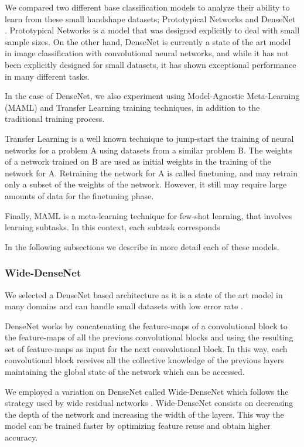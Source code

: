 We compared two different base classification models to analyze their ability to learn from these small handshape datasets; Prototypical Networks \cite{protonet} and DenseNet \cite{densenet}. Prototypical Networks is a model that was designed explicitly to deal with small sample sizes. On the other hand, DenseNet is currently a state of the art model in image classification with convolutional neural networks, and while it has not been explicitly designed for small datasets, it has shown exceptional performance in many different tasks. 

In the case of DenseNet, we also experiment using Model-Agnostic Meta-Learning (MAML) \cite{DBLP:journals/corr/FinnAL17} and Transfer Learning \cite{tan2018} training techniques, in addition to the traditional training process. 

Transfer Learning is a well known technique to jump-start the training of neural networks for a problem A using datasets from a similar problem B. The weights of a network trained on B are used as initial weights in the training of the network for A. Retraining the network for A is called finetuning, and may retrain only a subset of the weights of the network. However, it still may require large amounts of data for the finetuning phase.

Finally, MAML is a meta-learning technique for few-shot learning, that involves learning subtasks. In this context, each subtask corresponds

In the following subsections we describe in more detail each of these models.

\subsubsection{Wide-DenseNet}

We selected a DenseNet based architecture as it is a state of the art model in many domains and can handle small datasets with low error rate \cite{pmlr-v80-pham18a}.

DenseNet \cite{densenet} works by concatenating the feature-maps of a convolutional block to the feature-maps of all the previous convolutional blocks and using the resulting set of feature-maps as input for the next convolutional block. In this way, each convolutional block receives all the collective knowledge of the previous layers maintaining the global state of the network which can be accessed.

We employed a variation on DenseNet called Wide-DenseNet which follows the strategy used by wide residual networks \cite{He2015DeepRL}. Wide-DenseNet consists on decreasing the depth of the network and increasing the width of the layers. This way the model can be trained faster by optimizing feature reuse and obtain higher accuracy.

